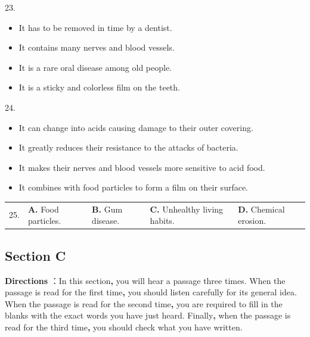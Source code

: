 \documentclass[UTF8,11pt]{ctexart}
\begin{document}
23.


\begin{itemize}[leftmargin=2em,itemsep=.2em,topsep=.4em]\item[A.] It has to be removed in time by a dentist.
\item[C.] It contains many nerves and blood vessels.
\end{itemize}

\begin{itemize}[leftmargin=2em,itemsep=.2em,topsep=.4em]\item[B.] It is a rare oral disease among old people.
\item[D.] It is a sticky and colorless film on the teeth.
\end{itemize}

24.


\begin{itemize}[leftmargin=2em,itemsep=.2em,topsep=.4em]\item[A.] It can change into acids causing damage to their outer covering.
\item[B.] It greatly reduces their resistance to the attacks of bacteria.
\item[C.] It makes their nerves and blood vessels more sensitive to acid food.
\item[D.] It combines with food particles to form a film on their surface.
\end{itemize}

\noindent\begin{tabularx}{\linewidth}{@{}lXXXX@{}}25. & \textbf{A.} Food particles. & \textbf{B.} Gum disease. & \textbf{C.} Unhealthy living habits. & \textbf{D.} Chemical erosion.\\\end{tabularx}\par

\subsection*{Section C}


\textbf{Directions} ：In this section\textbf{,} you will hear a passage three times. When the passage is read for the first time\textbf{,} you should listen carefully for its general idea. When the passage is read for the second time\textbf{,} you are required to fill in the blanks with the exact words you have just heard. Finally\textbf{,} when the passage is read for the third time\textbf{,} you should check what you have written.
\end{document}
